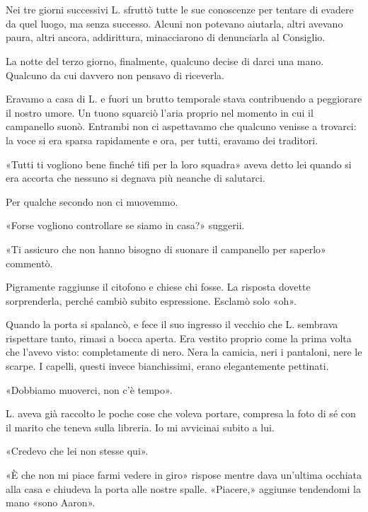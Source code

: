 \chapter{}
\label{ch:7}

Nei tre giorni successivi L. sfruttò tutte le sue conoscenze per tentare di evadere da quel luogo,
ma senza successo. Alcuni non potevano aiutarla, altri avevano paura, altri ancora, addirittura,
minacciarono di denunciarla al Consiglio.

La notte del terzo giorno, finalmente, qualcuno decise di darci una mano. Qualcuno da cui davvero
non pensavo di riceverla.

Eravamo a casa di L. e fuori un brutto temporale stava contribuendo a peggiorare il nostro umore. Un
tuono squarciò l'aria proprio nel momento in cui il campanello suonò. Entrambi non ci aspettavamo
che qualcuno venisse a trovarci: la voce si era sparsa rapidamente e ora, per tutti, eravamo dei
traditori.

«Tutti ti vogliono bene finché tifi per la loro squadra» aveva detto lei quando si era accorta che
nessuno si degnava più neanche di salutarci.

Per qualche secondo non ci muovemmo.

«Forse vogliono controllare se siamo in casa?» suggerii.

«Ti assicuro che non hanno bisogno di suonare il campanello per saperlo» commentò.

Pigramente raggiunse il citofono e chiese chi fosse. La risposta dovette sorprenderla, perché cambiò
subito espressione. Esclamò solo «oh».

Quando la porta si spalancò, e fece il suo ingresso il vecchio che L. sembrava rispettare tanto,
rimasi a bocca aperta. Era vestito proprio come la prima volta che l'avevo visto: completamente di
nero. Nera la camicia, neri i pantaloni, nere le scarpe. I capelli, questi invece bianchissimi,
erano elegantemente pettinati.

«Dobbiamo muoverci, non c'è tempo».

L. aveva già raccolto le poche cose che voleva portare, compresa la foto di sé con il marito che
teneva sulla libreria. Io mi avvicinai subito a lui.

«Credevo che lei non stesse qui».

«È che non mi piace farmi vedere in giro» rispose mentre dava un'ultima occhiata alla casa e
chiudeva la porta alle nostre spalle. «Piacere,» aggiunse tendendomi la mano «sono Aaron».

